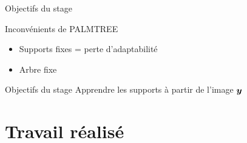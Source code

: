 \begin{frame}{Objectifs du stage}
\begin{alertblock}{Inconvénients de PALMTREE}
\begin{itemize}
\item Supports fixes = perte d'adaptabilité
\item Arbre fixe
\end{itemize}
\end{alertblock}
\begin{figure}\centering
\end{figure}
\begin{exampleblock}{Objectifs du stage}
Apprendre les supports à partir de l'image $\bm{y}$
\end{exampleblock}
\end{frame}




\section{Travail réalisé}

